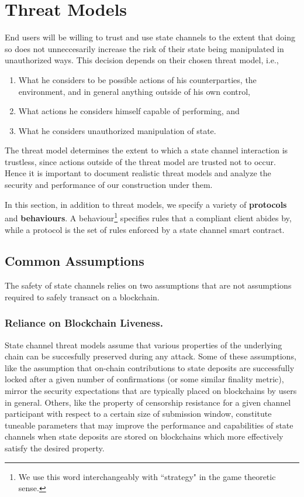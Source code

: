 \documentclass[prb,floatfix,reprint,nofootinbib,amsmath,amssymb,epsfig,pre,floats,letterpaper,groupedaffiliation,tightenlines,allcolors=blue,11pt]{revtex4}
\theoremstyle{definition}
\theoremstyle{definition}
\theoremstyle{definition}
\begin{document}
\section{Threat Models}
\label{sec:threat}

End users will be willing to trust and use state channels to the extent that doing so does not unneccesarily increase the risk of their state being manipulated in unauthorized ways. This decision depends on their chosen threat model, i.e.,

\begin{enumerate}
    \setlength\itemsep{0em}
    \item What he considers to be possible actions of his counterparties, the environment, and in general anything outside of his own control,
    \item What actions he considers himself capable of performing, and
    \item What he considers unauthorized manipulation of state.
\end{enumerate}

The threat model determines the extent to which a state channel interaction is trustless, since actions outside of the threat model are trusted not to occur. Hence it is important to document realistic threat models and analyze the security and performance of our construction under them.

In this section, in addition to threat models, we specify a variety of \textbf{protocols} and \textbf{behaviours}. A behaviour\footnote{We use this word interchangeably with ``strategy" in the game theoretic sense.} specifies rules that a compliant client abides by, while a protocol is the set of rules enforced by a state channel smart contract.

\subsection{Common Assumptions}

The safety of state channels relies on two assumptions that are not assumptions required to safely transact on a blockchain.

\subsubsection{Reliance on Blockchain Liveness.} State channel threat models assume that various properties of the underlying chain can be succesfully preserved during any attack. Some of these assumptions, like the assumption that on-chain contributions to state deposits are successfully locked after a given number of confirmations (or some similar finality metric), mirror the security expectations that are typically placed on blockchains by users in general. Others, like the property of censorship resistance for a given channel participant with respect to a certain size of submission window, constitute tuneable parameters that may improve the performance and capabilities of state channels when state deposits are stored on blockchains which more effectively satisfy the desired property.
\end{document}
